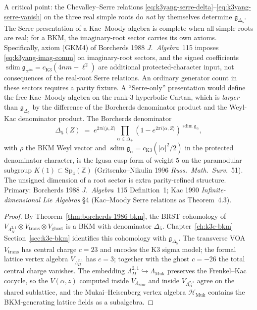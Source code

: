 \begin{remark}
\label{rem:k3yang-serre-not-sufficient}
A critical point: the Chevalley--Serre relations
\eqref{eq:k3yang-serre-delta}--\eqref{eq:k3yang-serre-vanish} on the three
real simple roots do \emph{not} by themselves determine
$\mathfrak{g}_{\Delta_5}$. The Serre presentation of a Kac--Moody
algebra is complete when all simple roots are real; for a BKM, the
imaginary-root sector carries its own axioms. Specifically, axiom
(GKM4) of Borcherds 1988 \emph{J.\ Algebra}~115 imposes
\eqref{eq:k3yang-imag-comm} on imaginary-root sectors, and the
signed coefficients
\(\operatorname{sdim}\mathfrak g_{\alpha^{\mathrm{im}}}
= c_{\mathrm{K3}}(4nm-\ell^2)\)
are additional protected-character input, not consequences of the
real-root Serre relations. An ordinary generator count in these
sectors requires a parity fixture. A ``Serre-only'' presentation would
define the free
Kac--Moody algebra on the rank-$3$ hyperbolic Cartan, which is
\emph{larger} than $\mathfrak{g}_{\Delta_5}$ by the difference of
the Borcherds denominator product and the Weyl-Kac denominator
product. The Borcherds denominator
\[
 \Delta_5(Z)
 \;=\;
 e^{2\pi i\langle\rho,Z\rangle}
 \prod_{\alpha\in\Delta_+}
 (1 - e^{2\pi i\langle\alpha,Z\rangle})^{\operatorname{sdim}\mathfrak g_\alpha},
\]
with $\rho$ the BKM Weyl vector and
\(\operatorname{sdim}\mathfrak g_\alpha
= c_{\mathrm{K3}}(|\alpha|^2/2)\) in the protected denominator
character, is the Igusa cusp form of weight $5$ on the paramodular
subgroup $K(1)\subset\mathrm{Sp}_4(\mathbb Z)$
(Gritsenko--Nikulin 1996 \emph{Russ.\ Math.\ Surv.}~51). The unsigned
dimension of a root sector is extra parity-refined structure.
Primary: Borcherds 1988 \emph{J.\ Algebra}~115 Definition~1;
Kac 1990 \emph{Infinite-dimensional Lie Algebras} \S4 (Kac--Moody
Serre relations as Theorem~4.3).
\end{remark}

\begin{proof}
By Theorem~\ref{thm:borcherds-1986-bkm}, the BRST cohomology of
$V_{\Lambda^{2,1}_{II}}\otimes V_{\mathrm{trans}}\otimes V_{\mathrm{ghost}}$
is a BKM with denominator $\Delta_5$. Chapter~\ref{ch:k3e-bkm}
Section~\ref{sec:k3e-bkm} identifies this cohomology with
$\mathfrak{g}_{\Delta_5}$. The transverse VOA $V_{\mathrm{trans}}$ has
central charge $c = 23$ and encodes the K3 sigma model; the formal lattice vertex algebra
$V_{\Lambda^{2,1}_{II}}$ has $c = 3$; together with the ghost $c = -26$
the total central charge vanishes. The embedding
$\Lambda^{2,1}_{II}\hookrightarrow\Lambda_{\mathrm{Muk}}$ preserves the
Frenkel--Kac cocycle, so the $V(\alpha,z)$ computed inside
$V_{\Lambda_{\mathrm{Muk}}}$ and inside $V_{\Lambda^{2,1}_{II}}$ agree on the
shared sublattice, and the Mukai--Heisenberg vertex algebra
$\mathcal{H}_{\mathrm{Muk}}$ contains the BKM-generating lattice fields as
a subalgebra.
\end{proof}

